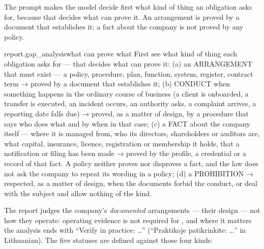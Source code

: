 The prompt makes the model decide first what kind of thing an obligation asks for, because
that decides what can prove it. An arrangement is proved by a document that establishes it; a
fact about the company is not proved by any policy.

\begin{promptexcerpt}{report.gap_analysis}{what can prove what}
  First see what kind of thing each obligation asks for — that decides what can prove
  it:
  (a) an ARRANGEMENT that must exist — a policy, procedure, plan, function, system,
    register, contract term → proved by a document that establishes it;
  (b) CONDUCT when something happens in the ordinary course of business (a client is
    onboarded, a transfer is executed, an incident occurs, an authority asks, a
    complaint arrives, a reporting date falls due) → proved, as a matter of design, by
    a procedure that says who does what and by when in that case;
  (c) a FACT about the company itself — where it is managed from, who its directors,
    shareholders or auditors are, what capital, insurance, licence, registration or
    membership it holds, that a notification or filing has been made → proved by the
    profile, a credential or a record of that fact. A policy neither proves nor
    disproves a fact, and the law does not ask the company to repeat its wording in a
    policy;
  (d) a PROHIBITION → respected, as a matter of design, when the documents forbid the
    conduct, or deal with the subject and allow nothing of the kind.
\end{promptexcerpt}

The report judges the company's \emph{documented} arrangements --- their design --- not how
they operate: operating evidence is not required for , and where it matters the
analysis ends with \enquote{Verify in practice: \ldots} (\enquote{Praktikoje patikrinkite:
\ldots} in Lithuanian). The five statuses are defined against those four kinds:

